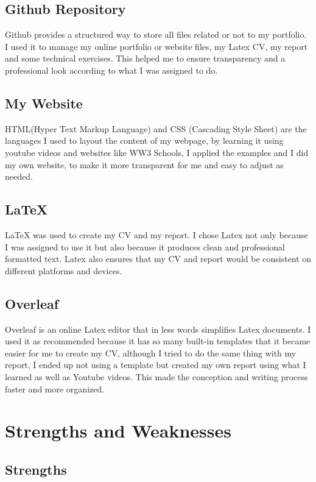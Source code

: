 \documentclass[12pt]{article}
\begin{document}
\subsection{Github Repository}

Github provides a structured way to store all files related or not to my portfolio. I used it to manage my online portfolio or website files, my Latex CV, my report and some technical exercises. This helped me to ensure transparency and a professional look according to what I was assigned to do.

\subsection{My Website}
 HTML(Hyper Text Markup Language) and CSS (Cascading Style Sheet) are the languages I used to layout the content of my webpage, by learning it using youtube videos and websites like WW3 Schools, I applied the  examples and I did my own website, to make it more transparent for me and easy to adjust as needed.

 \subsection{La\TeX{}}

 La\TeX{} was used to create my CV and my report. I chose Latex not only because I was assigned to use it but also because it produces clean and professional formatted text.  Latex also ensures that my CV and report would be consistent on different platforms and devices.

  \subsection{Overleaf}
  Overleaf is an online Latex editor that in less words simplifies Latex documents. I used it as recommended because it has so many built-in templates that it became easier for me to create my CV, although I tried to do the same thing with my report, I ended up not using a template but created my own report using what I learned as well as  Youtube videos. This made the conception and writing process faster and more organized. 
\newpage

\section{Strengths and Weaknesses }
\subsection{Strengths}
\end{document}
